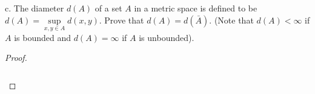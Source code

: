\pagebreak

c.  The diameter $d(A)$ of a set $A$ in a metric space is defined to be $d(A) = \sup\limits_{x,y \in A}{d(x, y)}$. Prove
    that $d(A) = d(\bar{A})$. (Note that $d(A) < \infty$ if $A$ is bounded and $d(A) = \infty$ if $A$ is unbounded).

\begin{proof}\renewcommand{\qedsymbol}{}\ \\\\
    \begin{align*}
    \end{align*}
\end{proof}

\pagebreak